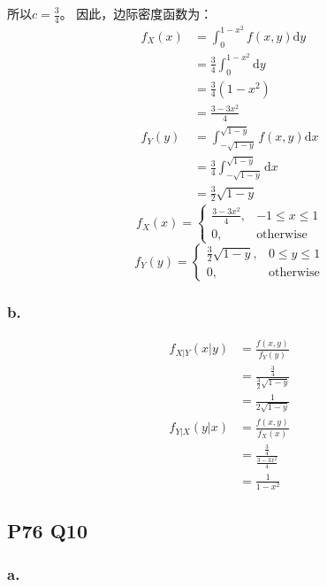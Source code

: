 \documentclass[a4paper,12pt]{ctexart}
\begin{document}
所以$c = \frac{3}{4}$。
因此，边际密度函数为：
\begin{align*}
	f_X(x) &= \int_{0}^{1-x^2} f(x,y) \mathrm{d}y \\
	&= \frac{3}{4} \int_{0}^{1-x^2} \mathrm{d}y \\
	&= \frac{3}{4} (1-x^2) \\
	&= \frac{3 - 3x^2}{4} \\
	f_Y(y) &= \int_{-\sqrt{1-y}}^{\sqrt{1-y}} f(x,y) \mathrm{d}x \\
	&= \frac{3}{4} \int_{-\sqrt{1-y}}^{\sqrt{1-y}} \mathrm{d}x \\
	&= \frac{3}{2} \sqrt{1-y}
\end{align*}
\begin{equation*}
	f_X(x) =
	\begin{cases}
		\frac{3 - 3x^2}{4}, & -1 \leq x \leq 1 \\
		0, & \text{otherwise}
	\end{cases}
\end{equation*}
\begin{equation*}
	f_Y(y) =
	\begin{cases}
		\frac{3}{2} \sqrt{1-y}, & 0 \leq y \leq 1 \\
		0, & \text{otherwise}
	\end{cases}
\end{equation*}

\subsubsection*{b.}

\begin{align*}
	f_{X|Y}(x|y) &= \frac{f(x,y)}{f_Y(y)} \\
	&= \frac{\frac{3}{4}}{\frac{3}{2} \sqrt{1-y}} \\
	&= \frac{1}{2\sqrt{1-y}} \\
	f_{Y|X}(y|x) &= \frac{f(x,y)}{f_X(x)} \\
	&= \frac{\frac{3}{4}}{\frac{3 - 3x^2}{4}} \\
	&= \frac{1}{1 - x^2}
\end{align*}

\subsection*{P76 Q10}

\subsubsection*{a.}
\end{document}
